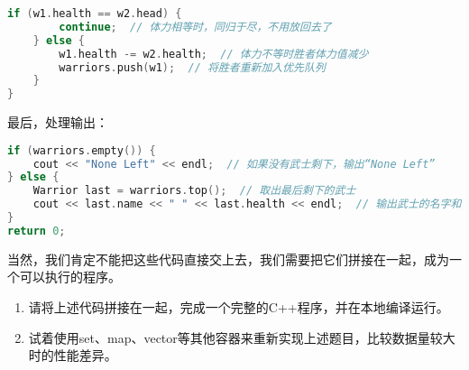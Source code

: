 \begin{answer}
\begin{lstlisting}[language=C++]
    if (w1.health == w2.head) {
        continue;  // 体力相等时，同归于尽，不用放回去了
    } else {
        w1.health -= w2.health;  // 体力不等时胜者体力值减少
        warriors.push(w1);  // 将胜者重新加入优先队列
    }
}
\end{lstlisting}

  最后，处理输出：
\begin{lstlisting}[language=C++]
if (warriors.empty()) {
    cout << "None Left" << endl;  // 如果没有武士剩下，输出“None Left”
} else {
    Warrior last = warriors.top();  // 取出最后剩下的武士
    cout << last.name << " " << last.health << endl;  // 输出武士的名字和体力值
}
return 0;
\end{lstlisting}

  当然，我们肯定不能把这些代码直接交上去，我们需要把它们拼接在一起，成为一个可以执行的程序。
\end{answer}

\begin{exercise}
  \begin{enumerate}
    \item 请将上述代码拼接在一起，完成一个完整的C++程序，并在本地编译运行。
    \item 试着使用set、map、vector等其他容器来重新实现上述题目，比较数据量较大时的性能差异。
  \end{enumerate}
\end{exercise}

